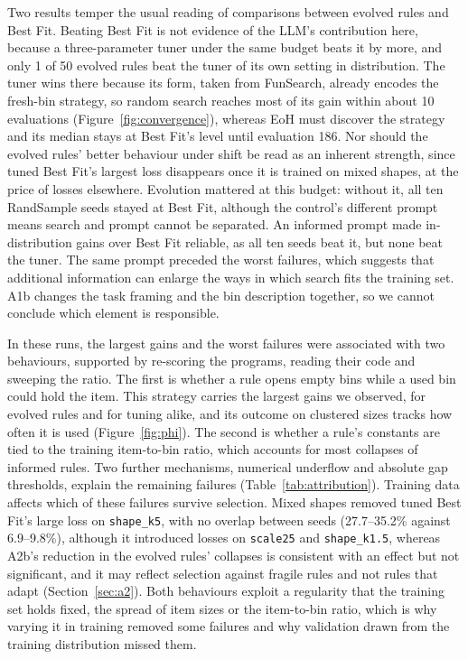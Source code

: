 \documentclass[10pt,twocolumn]{article}
\makeatletter
\renewcommand\section{\@startsection{section}{1}{\z@}{2.6ex \@plus .6ex \@minus .2ex}{1.4ex \@plus .2ex}{\normalfont\Large\bfseries}}
\makeatother
\begin{document}
\section{Discussion and limitations}
Two results temper the usual reading of comparisons between evolved rules and Best Fit. Beating Best Fit is not evidence of the LLM's contribution here, because a three-parameter tuner under the same budget beats it by more, and only 1 of 50 evolved rules beat the tuner of its own setting in distribution. The tuner wins there because its form, taken from FunSearch, already encodes the fresh-bin strategy, so random search reaches most of its gain within about 10 evaluations (Figure~\ref{fig:convergence}), whereas EoH must discover the strategy and its median stays at Best Fit's level until evaluation 186. Nor should the evolved rules' better behaviour under shift be read as an inherent strength, since tuned Best Fit's largest loss disappears once it is trained on mixed shapes, at the price of losses elsewhere. Evolution mattered at this budget: without it, all ten RandSample seeds stayed at Best Fit, although the control's different prompt means search and prompt cannot be separated. An informed prompt made in-distribution gains over Best Fit reliable, as all ten seeds beat it, but none beat the tuner. The same prompt preceded the worst failures, which suggests that additional information can enlarge the ways in which search fits the training set. A1b changes the task framing and the bin description together, so we cannot conclude which element is responsible.

In these runs, the largest gains and the worst failures were associated with two behaviours, supported by re-scoring the programs, reading their code and sweeping the ratio. The first is whether a rule opens empty bins while a used bin could hold the item. This strategy carries the largest gains we observed, for evolved rules and for tuning alike, and its outcome on clustered sizes tracks how often it is used (Figure~\ref{fig:phi}). The second is whether a rule's constants are tied to the training item-to-bin ratio, which accounts for most collapses of informed rules. Two further mechanisms, numerical underflow and absolute gap thresholds, explain the remaining failures (Table~\ref{tab:attribution}). Training data affects which of these failures survive selection. Mixed shapes removed tuned Best Fit's large loss on \texttt{shape\_k5}, with no overlap between seeds (27.7--35.2\% against 6.9--9.8\%), although it introduced losses on \texttt{scale25} and \texttt{shape\_k1.5}, whereas A2b's reduction in the evolved rules' collapses is consistent with an effect but not significant, and it may reflect selection against fragile rules and not rules that adapt (Section~\ref{sec:a2}). Both behaviours exploit a regularity that the training set holds fixed, the spread of item sizes or the item-to-bin ratio, which is why varying it in training removed some failures and why validation drawn from the training distribution missed them.
\end{document}
